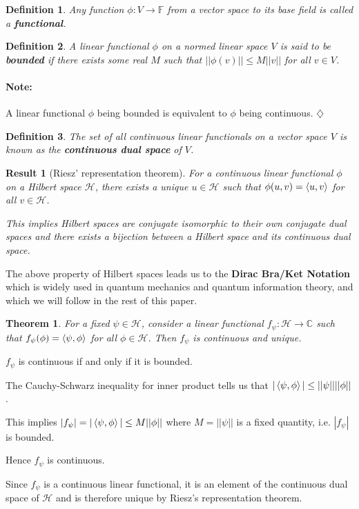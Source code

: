 \documentclass[12pt,twoside,fleqn]{report}
\makeatletter
\theoremstyle{thmstyle}
\renewenvironment{proof}[1][\proofname]{\par
\pushQED{\qed}%
\normalfont \topsep6\p@\@plus6\p@\relax
\trivlist
\item[\hskip\labelsep\itshape#1\@addpunct{.}]\mbox{}\par\nobreak\ignorespaces
}{%
    \popQED\endtrivlist\@endpefalse
    }
\newtheorem{defn}{Definition}[chapter]
\newtheorem{thm}{Theorem}[chapter]
\newtheorem{result}{Result}[chapter]
\newenvironment{note}{\paragraph{\textbf{Note:}}}{\hfill\ensuremath{\diamondsuit}}
\makeatother
\begin{document}
\begin{defn}
    Any function $\phi: V \to \mathbb{F}$ from a vector space to its base field is called a \textbf{functional}. 
\end{defn}

\begin{defn}
A linear functional $\phi$ on a normed linear space $V$ is said to be \textbf{bounded} if there exists some real $M$ such that $|| \phi(v)|| \leq M ||v||$ for all $v \in V$. 
\end{defn}

\begin{note}
A linear functional $\phi$ being bounded is equivalent to $\phi$ being continuous.
\end{note}


\begin{defn}
    The set of all continuous linear functionals on a vector space $V$ is known as the \textbf{continuous dual space} of $V$.
\end{defn}

\begin{result}[Riesz' representation theorem]
    For a continuous linear functional $\phi$ on a Hilbert space $\mathcal{H}$, there exists a unique $u \in \mathcal{H}$ such that $\phi(u,v) = \braket{u,v}$ for all $v \in \mathcal{H}$. 

    This implies Hilbert spaces are conjugate isomorphic to their own conjugate dual spaces and there exists a bijection between a Hilbert space and its continuous dual space.
\end{result}

The above property of Hilbert spaces leads us to the \textbf{Dirac Bra/Ket Notation} which is widely used in quantum mechanics and quantum information theory, and which we will follow in the rest of this paper.

\begin{samepage}
\begin{thm}
\label{innerproduct:continuous}
For a fixed $\psi \in \mathcal{H}$, consider a linear functional $f_\psi : \mathcal{H} \to \mathbb{C}$ such that $f_\psi(\phi) = \braket{\psi,\phi}$ for all $\phi \in \mathcal{H}$. Then $f_\psi$ is continuous and unique. 
\end{thm}
\begin{proof}
    $f_\psi$ is continuous if and only if it is bounded. 

    The Cauchy-Schwarz inequality for inner product tells us that $|\braket{\psi,\phi}| \leq ||\psi||||\phi||$.

    This implies $|f_\psi| = |\braket{\psi,\phi}| \leq M ||\phi||$ where $M = ||\psi||$ is a fixed quantity, i.e. $|f_\psi|$ is bounded.

    Hence $f_\psi$ is continuous. 

    
    Since $f_\psi$ is a continuous linear functional, it is an element of the continuous dual space of $\mathcal{H}$ and is therefore unique by Riesz's representation theorem.
\end{proof}
\end{samepage}
\end{document}
